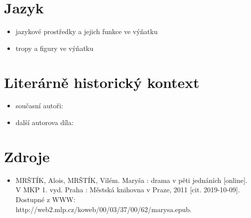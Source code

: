 \documentclass[10pt,a4paper]{article}
\begin{document}
\section*{Jazyk}
\begin{itemize}
\item jazykové prostředky a jejich funkce ve výňatku
\item tropy a figury ve výňatku
\end{itemize}
\section*{Literárně historický kontext}
\begin{itemize}
\item současní autoři:
\item další autorova díla:
\end{itemize}
\section*{Zdroje}
\begin{itemize}
\item MRŠTÍK, Alois, MRŠTÍK, Vilém. Maryša : drama v pěti jednáních [online]. V MKP 1. vyd. Praha : Městská knihovna v Praze, 2011 [cit. 2019-10-09]. Dostupné z WWW: \\ http://web2.mlp.cz/koweb/00/03/37/00/62/marysa.epub.
\end{itemize}


\end{document}
